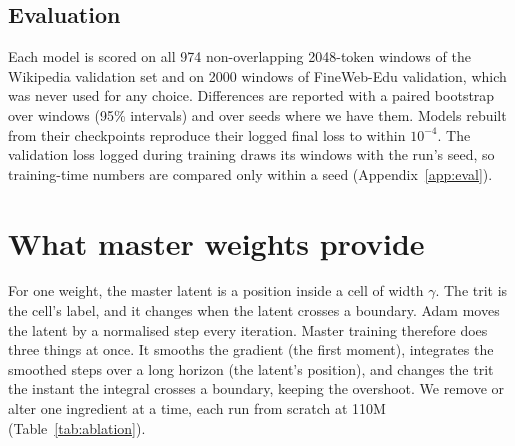 \documentclass[10pt,twocolumn]{article}
\begin{document}
\subsection{Evaluation}
Each model is scored on all 974 non-overlapping 2048-token windows of the Wikipedia validation set and on 2000 windows of
FineWeb-Edu validation, which was never used for any choice. Differences are reported with a paired bootstrap over
windows (95\% intervals) and over seeds where we have them. Models rebuilt from their checkpoints reproduce their logged
final loss to within $10^{-4}$. The validation loss logged during training draws its windows with the run's seed, so
training-time numbers are compared only within a seed (Appendix~\ref{app:eval}).

\section{What master weights provide}\label{sec:ablation}

For one weight, the master latent is a position inside a cell of width $\gamma$. The trit is the cell's label, and it
changes when the latent crosses a boundary. Adam moves the latent by a normalised step every iteration. Master
training therefore does three things at once. It smooths the gradient (the first moment), integrates the smoothed steps
over a long horizon (the latent's position), and changes the trit the instant the integral crosses a boundary,
keeping the overshoot. We remove or alter one ingredient at a time, each run from scratch at 110M
(Table~\ref{tab:ablation}).
\end{document}
